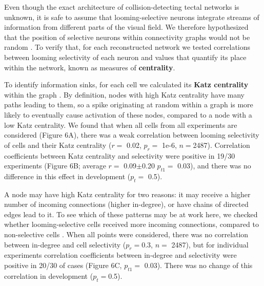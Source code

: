 \documentclass{article}
\begin{document}
Even though the exact architecture of collision-detecting tectal networks is unknown, it is safe to assume that looming-selective neurons integrate streams of information from different parts of the visual field. We therefore hypothesized that the position of selective neurons within connectivity graphs would not be random \citep{timme2016degree}. To verify that, for each reconstructed network we tested correlations between looming selectivity of each neuron and values that quantify its place within the network, known as measures of \textbf{centrality}.

To identify information sinks, for each cell we calculated its \textbf{Katz centrality} within the graph \citep{katz1953original,fletcher2018katz}. By definition, nodes with high Katz centrality have many paths leading to them, so a spike originating at random within a graph is more likely to eventually cause activation of these nodes, compared to a node with a low Katz centrality. We found that when all cells from all experiments are considered (Figure 6A), there was a weak correlation between looming selectivity of cells and their Katz centrality ($r =$ 0.02, $p_{r} =$ 1e-6, $n=$2487). Correlation coefficients between Katz centrality and selectivity were positive in 19/30 experiments (Figure 6B; average $r=$ 0.09$\pm$0.20 $p_{t1}=$ 0.03), and there was no difference in this effect in development ($p_t=$ 0.5).

A node may have high Katz centrality for two reasons: it may receive a higher number of incoming connections (higher in-degree), or have chains of directed edges lead to it. To see which of these patterns may be at work here, we checked whether looming-selective cells received more incoming connections, compared to non-selective cells \citep{litwin2014assemblies}. When all points were considered, there was no correlation between in-degree and cell selectivity ($p_{r}=$0.3, $n=$ 2487), but for individual experiments correlation coefficients between in-degree and selectivity were positive in 20/30 of cases (Figure 6C, $p_{t1}=$ 0.03). There was no change of this correlation in development ($p_t=$0.5).

\end{document}
